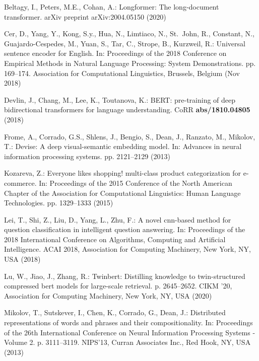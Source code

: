 \documentclass[runningheads, envcountsame, a4paper]{llncs}
\begin{document}
\begin{thebibliography}{10}
\providecommand{\url}[1]{\texttt{#1}}
\providecommand{\urlprefix}{URL }
\providecommand{\doi}[1]{https://doi.org/#1}

Beltagy, I., Peters, M.E., Cohan, A.: Longformer: The long-document
  transformer. arXiv preprint arXiv:2004.05150  (2020)

Cer, D., Yang, Y., Kong, S.y., Hua, N., Limtiaco, N., St.~John, R., Constant,
  N., Guajardo-Cespedes, M., Yuan, S., Tar, C., Strope, B., Kurzweil, R.:
  Universal sentence encoder for {E}nglish. In: Proceedings of the 2018
  Conference on Empirical Methods in Natural Language Processing: System
  Demonstrations. pp. 169--174. Association for Computational Linguistics,
  Brussels, Belgium (Nov 2018)

Devlin, J., Chang, M., Lee, K., Toutanova, K.: {BERT:} pre-training of deep
  bidirectional transformers for language understanding. CoRR
  \textbf{abs/1810.04805} (2018)

Frome, A., Corrado, G.S., Shlens, J., Bengio, S., Dean, J., Ranzato, M.,
  Mikolov, T.: Devise: A deep visual-semantic embedding model. In: Advances in
  neural information processing systems. pp. 2121--2129 (2013)

Kozareva, Z.: Everyone likes shopping! multi-class product categorization for
  e-commerce. In: Proceedings of the 2015 Conference of the North American
  Chapter of the Association for Computational Linguistics: Human Language
  Technologies. pp. 1329--1333 (2015)

Lei, T., Shi, Z., Liu, D., Yang, L., Zhu, F.: A novel cnn-based method for
  question classification in intelligent question answering. In: Proceedings of
  the 2018 International Conference on Algorithms, Computing and Artificial
  Intelligence. ACAI 2018, Association for Computing Machinery, New York, NY,
  USA (2018)

Lu, W., Jiao, J., Zhang, R.: Twinbert: Distilling knowledge to twin-structured
  compressed bert models for large-scale retrieval. p. 2645–2652. CIKM '20,
  Association for Computing Machinery, New York, NY, USA (2020)

Mikolov, T., Sutskever, I., Chen, K., Corrado, G., Dean, J.: Distributed
  representations of words and phrases and their compositionality. In:
  Proceedings of the 26th International Conference on Neural Information
  Processing Systems - Volume 2. p. 3111–3119. NIPS’13, Curran Associates
  Inc., Red Hook, NY, USA (2013)


\end{thebibliography}
\end{document}
